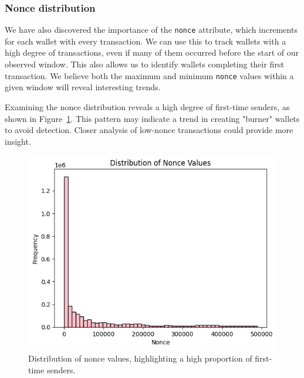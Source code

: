 \documentclass[sigconf]{acmart}
\begin{document}
\subsubsection{Nonce distribution}
We have also discovered the importance of the \texttt{nonce} attribute, which increments for each wallet with every transaction. We can use this to track wallets with a high degree of transactions, even if many of them occurred before the start of our observed window. This also allows us to identify wallets completing their first transaction. We believe both the maximum and minimum \texttt{nonce} values within a given window will reveal interesting trends.

Examining the nonce distribution reveals a high degree of first-time senders, as shown in Figure~\ref{fig:nonceDistro}. This pattern may indicate a trend in creating "burner" wallets to avoid detection. Closer analysis of low-nonce transactions could provide more insight.

\begin{figure}[H]
    \centering
    \includegraphics[width=0.8\linewidth]{M6-nonce-distro.png}
    \caption{Distribution of nonce values, highlighting a high proportion of first-time senders.}
    \label{fig:nonceDistro}
\end{figure}
\end{document}
